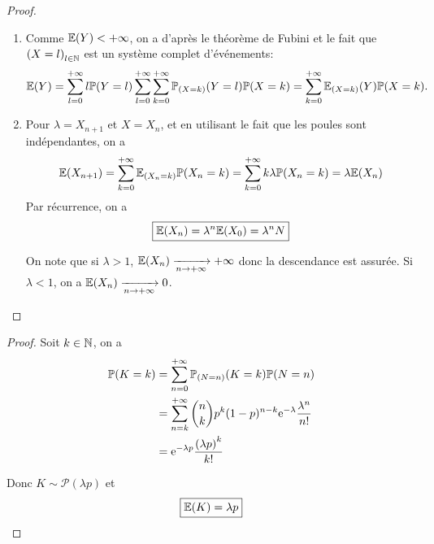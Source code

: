 \documentclass[12pt]{article}
\begin{document}
\begin{proof}
    \phantom{}
    \begin{enumerate}
        \item Comme $\mathbb{E}(Y)<+\infty$, on a d'après le théorème de Fubini et le fait que $\left(X=l\right)_{l\in\mathbb{N}}$ est un système complet d'événements:
        \begin{equation}
            \mathbb{E}(Y)=\sum_{l=0}^{+\infty}l\mathbb{P}(Y=l)\sum_{l=0}^{+\infty}\sum_{k=0}^{+\infty}\mathbb{P}_{(X=k)}(Y=l)\mathbb{P}(X=k)=\sum_{k=0}^{+\infty}\mathbb{E}_{(X=k)}(Y)\mathbb{P}(X=k).
        \end{equation}

        \item Pour $\lambda=X_{n+1}$ et $X=X_{n}$, et en utilisant le fait que les poules sont indépendantes, on a 
        \begin{equation}
            \mathbb{E}(X_{n+1})=\sum_{k=0}^{+\infty}\mathbb{E}_{(X_{n}=k)}\mathbb{P}(X_{n}=k)=\sum_{k=0}^{+\infty}k\lambda\mathbb{P}(X_{n}=k)=\lambda\mathbb{E}(X_{n})
        \end{equation}
        Par récurrence, on a 
        \begin{equation}
            \boxed{\mathbb{E}(X_{n})=\lambda^{n}\mathbb{E}(X_{0})=\lambda^{n}N}
        \end{equation}

        On note que si $\lambda>1$, $\mathbb{E}(X_{n})\xrightarrow[n\to+\infty]{}+\infty$ donc la descendance est assurée. Si $\lambda<1$, on a $\mathbb{E}(X_{n})\xrightarrow[n\to+\infty]{}0$.
    \end{enumerate}
\end{proof}

\begin{proof}
    Soit $k\in\mathbb{N}$, on a 
    \begin{align}
        \mathbb{P}(K=k)
        &=\sum_{n=0}^{+\infty}\mathbb{P}_{(N=n)}(K=k)\mathbb{P}(N=n)\\
        &=\sum_{n=k}^{+\infty}\binom{n}{k}p^{k}(1-p)^{n-k}\mathrm{e}^{-\lambda}\frac{\lambda^{n}}{n!}\\
        &=\mathrm{e}^{-\lambda p}\frac{\left(\lambda p\right)^{k}}{k!}
    \end{align}

    Donc $K\sim\mathcal{P}(\lambda p)$ et 
    \begin{equation}
        \boxed{\mathbb{E}(K)=\lambda p}
    \end{equation}
\end{proof}
\end{document}
